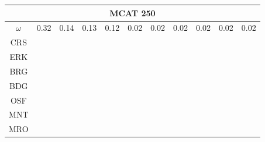 \documentclass[12pt]{article}
\begin{document}
\begin{figure}[h!]
\centering
\begin{tabular}{|c|c|c|c|c|c|c|c|c|c|c|}
        \hline \multicolumn{11}{|c|}{MCAT 250} \\ \hline 
        $\omega$&0.32&0.14&0.13&0.12&0.02&0.02&0.02&0.02&0.02&0.02 \\ \hline
        CRS&\cellcolor[HTML]{E41A1C}&\cellcolor[HTML]{E41A1C}&\cellcolor[HTML]{E41A1C}&\cellcolor[HTML]{E41A1C}&\cellcolor[HTML]{E41A1C}&\cellcolor[HTML]{E41A1C}&\cellcolor[HTML]{E41A1C}&\cellcolor[HTML]{E41A1C}&\cellcolor[HTML]{E41A1C}&\cellcolor[HTML]{E41A1C} \\ \hline%
        ERK&\cellcolor[HTML]{377EB8}&\cellcolor[HTML]{377EB8}&\cellcolor[HTML]{377EB8}&\cellcolor[HTML]{377EB8}&\cellcolor[HTML]{377EB8}&\cellcolor[HTML]{377EB8}&\cellcolor[HTML]{377EB8}&\cellcolor[HTML]{377EB8}&\cellcolor[HTML]{377EB8}&\cellcolor[HTML]{377EB8} \\ \hline%
        BRG&\cellcolor[HTML]{4DAF4A}&\cellcolor[HTML]{4DAF4A}&\cellcolor[HTML]{4DAF4A}&\cellcolor[HTML]{4DAF4A}&\cellcolor[HTML]{4DAF4A}&\cellcolor[HTML]{4DAF4A}&\cellcolor[HTML]{4DAF4A}&\cellcolor[HTML]{4DAF4A}&\cellcolor[HTML]{4DAF4A}&\cellcolor[HTML]{4DAF4A} \\ \hline%
        BDG&\cellcolor[HTML]{4DAF4A}&\cellcolor[HTML]{4DAF4A}&\cellcolor[HTML]{4DAF4A}&\cellcolor[HTML]{4DAF4A}&\cellcolor[HTML]{4DAF4A}&\cellcolor[HTML]{4DAF4A}&\cellcolor[HTML]{4DAF4A}&\cellcolor[HTML]{984EA3}&\cellcolor[HTML]{4DAF4A}&\cellcolor[HTML]{4DAF4A} \\ \hline%
        OSF&\cellcolor[HTML]{984EA3}&\cellcolor[HTML]{984EA3}&\cellcolor[HTML]{984EA3}&\cellcolor[HTML]{984EA3}&\cellcolor[HTML]{4DAF4A}&\cellcolor[HTML]{4DAF4A}&\cellcolor[HTML]{4DAF4A}&\cellcolor[HTML]{984EA3}&\cellcolor[HTML]{4DAF4A}&\cellcolor[HTML]{4DAF4A} \\ \hline%
        MNT&\cellcolor[HTML]{984EA3}&\cellcolor[HTML]{984EA3}&\cellcolor[HTML]{984EA3}&\cellcolor[HTML]{984EA3}&\cellcolor[HTML]{984EA3}&\cellcolor[HTML]{984EA3}&\cellcolor[HTML]{984EA3}&\cellcolor[HTML]{FF7F00}&\cellcolor[HTML]{984EA3}&\cellcolor[HTML]{984EA3} \\ \hline%
        MRO&\cellcolor[HTML]{984EA3}&\cellcolor[HTML]{984EA3}&\cellcolor[HTML]{984EA3}&\cellcolor[HTML]{984EA3}&\cellcolor[HTML]{984EA3}&\cellcolor[HTML]{984EA3}&\cellcolor[HTML]{984EA3}&\cellcolor[HTML]{FF7F00}&\cellcolor[HTML]{984EA3}&\cellcolor[HTML]{984EA3} \\ \hline%

\end{tabular}
\end{figure}
\end{document}
